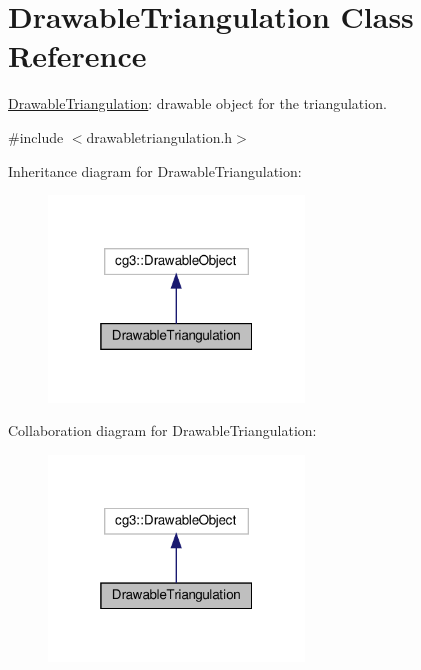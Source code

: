 \hypertarget{classDrawableTriangulation}{}\section{Drawable\+Triangulation Class Reference}
\label{classDrawableTriangulation}


\hyperlink{classDrawableTriangulation}{Drawable\+Triangulation}\+: drawable object for the triangulation.  




{\ttfamily \#include $<$drawabletriangulation.\+h$>$}



Inheritance diagram for Drawable\+Triangulation\+:\nopagebreak
\begin{figure}[H]
\begin{center}
\leavevmode
\includegraphics[width=193pt]{classDrawableTriangulation__inherit__graph}
\end{center}
\end{figure}


Collaboration diagram for Drawable\+Triangulation\+:\nopagebreak
\begin{figure}[H]
\begin{center}
\leavevmode
\includegraphics[width=193pt]{classDrawableTriangulation__coll__graph}
\end{center}
\end{figure}
